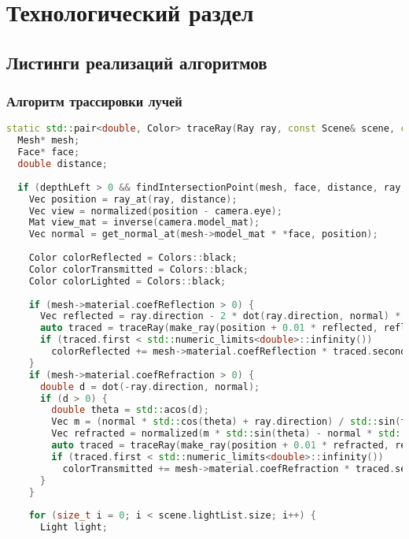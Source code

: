 \chapter{Технологический раздел}

\section{Листинги реализаций алгоритмов}

\subsection{Алгоритм трассировки лучей}

\begin{lstlisting}[language=C++]
static std::pair<double, Color> traceRay(Ray ray, const Scene& scene, const Camera& camera, int depthLeft) {
  Mesh* mesh;
  Face* face;
  double distance;
  
  if (depthLeft > 0 && findIntersectionPoint(mesh, face, distance, ray, scene)) {
    Vec position = ray_at(ray, distance);
    Vec view = normalized(position - camera.eye);
    Mat view_mat = inverse(camera.model_mat);
    Vec normal = get_normal_at(mesh->model_mat * *face, position);
    
    Color colorReflected = Colors::black;
    Color colorTransmitted = Colors::black;
    Color colorLighted = Colors::black;
    
    if (mesh->material.coefReflection > 0) {
      Vec reflected = ray.direction - 2 * dot(ray.direction, normal) * normal;
      auto traced = traceRay(make_ray(position + 0.01 * reflected, reflected), scene, camera, depthLeft - 1);
      if (traced.first < std::numeric_limits<double>::infinity())
        colorReflected += mesh->material.coefReflection * traced.second;
    }
    if (mesh->material.coefRefraction > 0) {
      double d = dot(-ray.direction, normal);
      if (d > 0) {
        double theta = std::acos(d);
        Vec m = (normal * std::cos(theta) + ray.direction) / std::sin(theta);
        Vec refracted = normalized(m * std::sin(theta) - normal * std::cos(theta));
        auto traced = traceRay(make_ray(position + 0.01 * refracted, refracted), scene, camera, depthLeft - 1);
        if (traced.first < std::numeric_limits<double>::infinity())
          colorTransmitted += mesh->material.coefRefraction * traced.second;
      }
    }
    
    for (size_t i = 0; i < scene.lightList.size; i++) {
      Light light;
  

\end{lstlisting}
